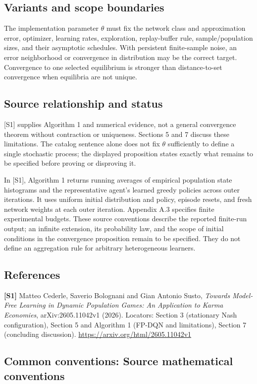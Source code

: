 \documentclass[11pt,a4paper]{article}
\begin{document}
\subsection*{Variants and scope boundaries}
The implementation parameter $\theta$ must fix the network class and approximation error, optimizer, learning rates, exploration, replay-buffer rule, sample/population sizes, and their asymptotic schedules. With persistent finite-sample noise, an error neighborhood or convergence in distribution may be the correct target. Convergence to one selected equilibrium is stronger than distance-to-set convergence when equilibria are not unique.
\subsection*{Source relationship and status}
[S1] supplies Algorithm 1 and numerical evidence, not a general convergence theorem without contraction or uniqueness. Sections 5 and 7 discuss these limitations. The catalog sentence alone does not fix $\theta$ sufficiently to define a single stochastic process; the displayed proposition states exactly what remains to be specified before proving or disproving it.

In [S1], Algorithm 1 returns running averages of empirical population state histograms and the representative agent's learned greedy policies across outer iterations. It uses uniform initial distribution and policy, episode resets, and fresh network weights at each outer iteration. Appendix A.3 specifies finite experimental budgets. These source conventions describe the reported finite-run output; an infinite extension, its probability law, and the scope of initial conditions in the convergence proposition remain to be specified. They do not define an aggregation rule for arbitrary heterogeneous learners.
\subsection*{References}
\begingroup\footnotesize\raggedright
\textbf{[S1]} Matteo Cederle, Saverio Bolognani and Gian Antonio Susto, \emph{Towards Model-Free Learning in Dynamic Population Games: An Application to Karma Economies}, arXiv:2605.11042v1 (2026). Locators: Section 3 (stationary Nash configuration), Section 5 and Algorithm 1 (FP-DQN and limitations), Section 7 (concluding discussion). \url{https://arxiv.org/html/2605.11042v1}
\par\endgroup

\subsection*{Common conventions: Source mathematical conventions}
\end{document}
